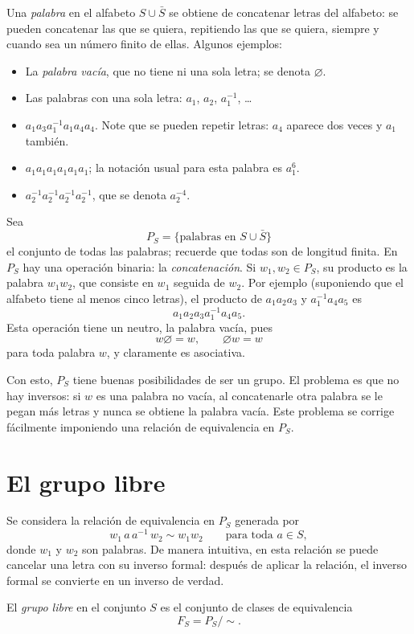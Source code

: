 \documentclass[11pt]{article}
\begin{document}
Una \emph{palabra} en el alfabeto $S\cup\bar S$ se obtiene de concatenar letras del alfabeto: se pueden concatenar las que se quiera, repitiendo las que se quiera, siempre y cuando sea un número finito de ellas. Algunos ejemplos:
\begin{itemize}
  \item La \emph{palabra vacía}, que no tiene ni una sola letra; se denota $\varnothing$.
  \item Las palabras con una sola letra: $a_1$, $a_2$, $a_1^{-1}$, \dots
  \item $a_1a_3a_1^{-1}a_1a_4a_4$. Note que se pueden repetir letras: $a_4$ aparece dos veces y $a_1$ también.
  \item $a_1a_1a_1a_1a_1a_1$; la notación usual para esta palabra es $a_1^{6}$.
  \item $a_2^{-1}a_2^{-1}a_2^{-1}a_2^{-1}$, que se denota $a_2^{-4}$.
\end{itemize}

Sea
\[
  P_S=\{\text{palabras en } S\cup\bar S\}
\]
el conjunto de todas las palabras; recuerde que todas son de longitud finita. En $P_S$ hay una operación binaria: la \emph{concatenación}. Si $w_1,w_2\in P_S$, su producto es la palabra $w_1w_2$, que consiste en $w_1$ seguida de $w_2$. Por ejemplo (suponiendo que el alfabeto tiene al menos cinco letras), el producto de $a_1a_2a_3$ y $a_1^{-1}a_4a_5$ es
\[
  a_1a_2a_3a_1^{-1}a_4a_5.
\]
Esta operación tiene un neutro, la palabra vacía, pues
\[
  w\varnothing=w,\qquad \varnothing w=w
\]
para toda palabra $w$, y claramente es asociativa.

Con esto, $P_S$ tiene buenas posibilidades de ser un grupo. El problema es que no hay inversos: si $w$ es una palabra no vacía, al concatenarle otra palabra se le pegan más letras y nunca se obtiene la palabra vacía. Este problema se corrige fácilmente imponiendo una relación de equivalencia en $P_S$.

\section*{El grupo libre}

Se considera la relación de equivalencia en $P_S$ generada por
\[
  w_1\,a\,a^{-1}\,w_2\sim w_1w_2\qquad\text{para toda } a\in S,
\]
donde $w_1$ y $w_2$ son palabras. De manera intuitiva, en esta relación se puede cancelar una letra con su inverso formal: después de aplicar la relación, el inverso formal se convierte en un inverso de verdad.

\begin{defn}\label{defn:grupo-libre}
El \emph{grupo libre} en el conjunto $S$ es el conjunto de clases de equivalencia
\[
  F_S=P_S/{\sim}.
\]
\end{defn}
\end{document}
